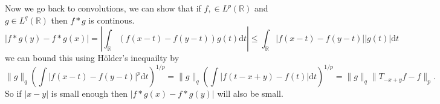 \documentclass[11pt]{article}
\theoremstyle{definition}
\theoremstyle{remark}
\begin{document}
Now we go back to convolutions, we can show that if $f,  \in L^p(\mathbb{R})$ and $g \in L^q(\mathbb{R})$ then $f*g$ is continous. 
\[ |f*g(y) - f*g(x)| = |\int_{\mathbb{R}}(f(x-t) - f(y-t)) g(t) \mathrm{d}t| \leq \int_\mathbb{R} |f(x-t)-f(y-t)||g(t)| \mathrm{d}t  \]
we can bound this using H\"older's inequailty by
\[ \|g\|_q \left(\int |f(x-t) - f(y-t)|^p\mathrm{d}t\right)^{1/p} = \|g\|_q \left(\int |f(t-x+y) - f(t)| \mathrm{d}t\right)^{1/p} = \|g\|_q \| T_{-x+y} f - f\|_p. \] So if $|x-y|$ is small enough then $|f*g(x) - f*g(y)|$ will also be small.
\end{document}
